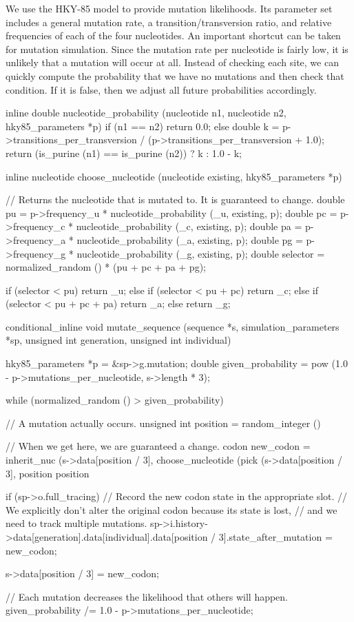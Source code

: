 \documentclass{article}
\begin{document}
      We use the HKY-85 model to provide mutation likelihoods. Its parameter set
      includes a general mutation rate, a transition/transversion ratio, and
      relative frequencies of each of the four nucleotides. An important
      shortcut can be taken for mutation simulation. Since the mutation rate per
      nucleotide is fairly low, it is unlikely that a mutation will occur at
      all. Instead of checking each site, we can quickly compute the probability
      that we have no mutations and then check that condition. If it is false,
      then we adjust all future probabilities accordingly.

\begin{ccode}
inline double nucleotide_probability (nucleotide n1, nucleotide n2, hky85_parameters *p) {
  if (n1 == n2)
    return 0.0;
  else {
    double k = p->transitions_per_transversion /
	       (p->transitions_per_transversion + 1.0);
    return (is_purine (n1) == is_purine (n2)) ? k : 1.0 - k;
  }
}

inline nucleotide choose_nucleotide (nucleotide existing, hky85_parameters *p) {
  // Returns the nucleotide that is mutated to. It is guaranteed to change.
  double pu        = p->frequency_u * nucleotide_probability (_u, existing, p);
  double pc        = p->frequency_c * nucleotide_probability (_c, existing, p);
  double pa        = p->frequency_a * nucleotide_probability (_a, existing, p);
  double pg        = p->frequency_g * nucleotide_probability (_g, existing, p);
  double selector  = normalized_random () * (pu + pc + pa + pg);

  if (selector < pu)        	 	return _u;
  else if (selector < pu + pc)		return _c;
  else if (selector < pu + pc + pa)	return _a;
  else					return _g;
}

conditional_inline void mutate_sequence (sequence *s, simulation_parameters *sp,
					 unsigned int generation, unsigned int individual) {
  hky85_parameters *p = &sp->g.mutation;
  double given_probability = pow (1.0 - p->mutations_per_nucleotide, s->length * 3);

  while (normalized_random () > given_probability) {
    // A mutation actually occurs.
    unsigned int position = random_integer () %

    // When we get here, we are guaranteed a change.
    codon new_codon =
      inherit_nuc (s->data[position / 3],
		   choose_nucleotide (pick (s->data[position / 3], position %
		   position %

    if (sp->o.full_tracing)
      // Record the new codon state in the appropriate slot.
      // We explicitly don't alter the original codon because its state is lost,
      // and we need to track multiple mutations.
      sp->i.history->data[generation].data[individual].data[position / 3].state_after_mutation = new_codon;

    s->data[position / 3] = new_codon;
    
    // Each mutation decreases the likelihood that others will happen.
    given_probability /= 1.0 - p->mutations_per_nucleotide;
  }
}
\end{ccode}
\end{document}
